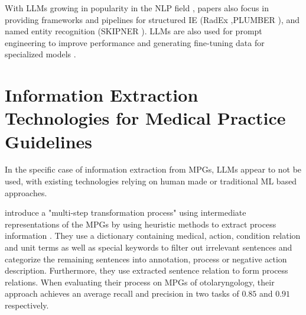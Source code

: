 \documentclass[bs, english]{stthesis}
\begin{document}
With LLMs growing in popularity in the NLP field \cite{xiaAnalyzing16193LLM2025}, papers also focus in providing frameworks and pipelines for structured IE (RadEx \cites{reichenpfaderRadExFrameworkStructured2024},PLUMBER \cite{jaradehBetterCallPlumber2021a}), and named entity recognition (SKIPNER \cite{bianOneshotBiomedicalNamed2024}). LLMs are also used for prompt engineering to improve performance \cite{huImprovingLargeLanguage2024,zhangAutomaticPromptDesign2025} and generating fine-tuning data for specialized models \cite{meoniLargeLanguageModels2023}.

\section{Information Extraction Technologies for Medical Practice Guidelines}
\label{sec:IETecMPGs}

In the specific case of information extraction from MPGs, LLMs appear to not be used, with existing technologies relying on human made or traditional ML based approaches.

\citeauthor*{kaiserGainingProcessInformation2005} introduce a "multi-step transformation process" using intermediate representations of the MPGs by using heuristic methods to extract process information \cite{kaiserGainingProcessInformation2005}. They use a dictionary containing medical, action, condition relation and unit terms as well as special keywords to filter out irrelevant sentences and categorize the remaining sentences into annotation, process or negative action description. Furthermore, they use extracted sentence relation to form process relations. When evaluating their process on MPGs of otolaryngology, their approach achieves an average recall and precision in two tasks of $0.85$ and $0.91$ respectively.
\end{document}
